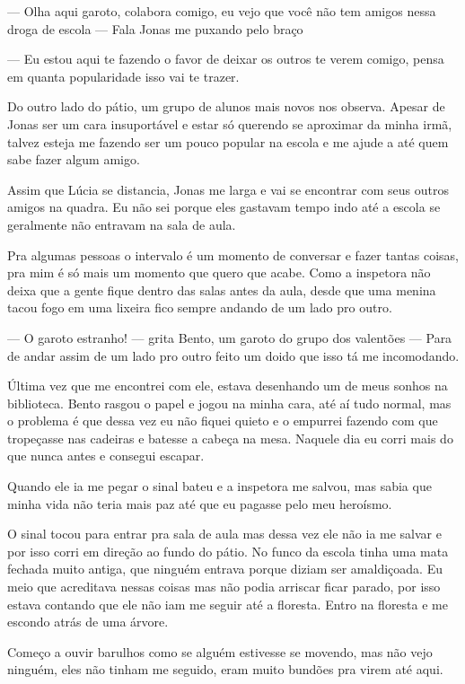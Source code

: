 — Olha aqui garoto, colabora comigo, eu vejo que você não tem amigos nessa droga de escola — Fala Jonas me puxando pelo braço 

— Eu estou aqui te fazendo o favor de deixar os outros te verem comigo, pensa em quanta popularidade isso vai te trazer.

Do outro lado do pátio, um grupo de alunos mais novos nos observa. Apesar de Jonas ser um cara insuportável e estar só querendo se aproximar da minha irmã, talvez esteja me fazendo ser um pouco popular na escola e me ajude a até quem sabe fazer algum amigo.

Assim que Lúcia se distancia, Jonas me larga e vai se encontrar com seus outros amigos na quadra. Eu não sei porque eles gastavam tempo indo até a escola se geralmente não entravam na sala de aula.

Pra algumas pessoas o intervalo é um momento de conversar e fazer tantas coisas, pra mim é só mais um momento que quero que acabe. Como a inspetora não deixa que a gente fique dentro das salas antes da aula, desde que uma menina tacou fogo em uma lixeira fico sempre andando de um lado pro outro.

— O garoto estranho! — grita Bento, um garoto do grupo dos valentões — Para de andar assim de um lado pro outro feito um doido que isso tá me incomodando.

Última vez que me encontrei com ele, estava desenhando um de meus sonhos na biblioteca. Bento rasgou o papel e jogou na minha cara, até aí tudo normal, mas o problema é que dessa vez eu não fiquei quieto e o empurrei fazendo com que tropeçasse nas cadeiras e batesse a cabeça na mesa. Naquele dia eu corri mais do que nunca antes e consegui escapar. 

Quando ele ia me pegar o sinal bateu e a inspetora me salvou, mas sabia que minha vida não teria mais paz até que eu pagasse pelo meu heroísmo.

O sinal tocou para entrar pra sala de aula mas dessa vez ele não ia me salvar e por isso corri em direção ao fundo do pátio. No funco da escola tinha uma mata fechada muito antiga, que ninguém entrava porque diziam ser amaldiçoada. Eu meio que acreditava nessas coisas mas não podia arriscar ficar parado, por isso estava contando que ele não iam me seguir até a floresta. Entro na floresta e me escondo atrás de uma árvore. 

Começo a ouvir barulhos como se alguém estivesse se movendo, mas não vejo ninguém, eles não tinham me seguido, eram muito bundões pra virem até aqui.

